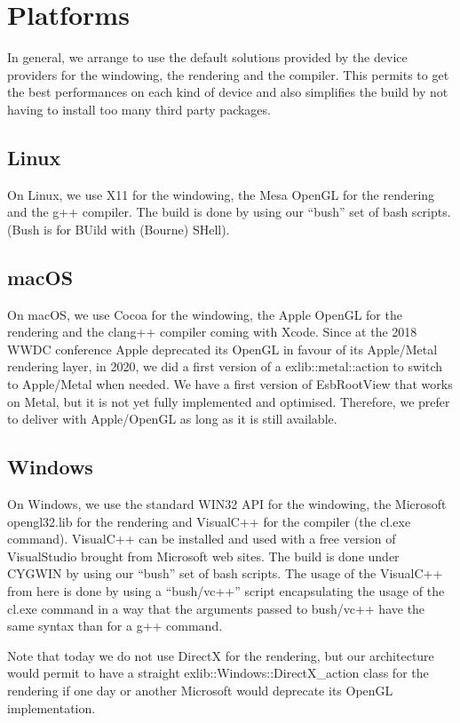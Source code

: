 \documentclass{webofc}
\begin{document}
\section{Platforms}
In general, we arrange to use the default solutions provided by the
device providers for the windowing, the rendering and the
compiler. This permits to get the best performances on each kind of
device and also simplifies the build by not having to install too
many third party packages.

\subsection{Linux}
On Linux, we use X11 for the windowing, the Mesa OpenGL for the
rendering and the g++ compiler. The build is done by using our
``bush'' set of bash scripts. (Bush is for BUild with (Bourne) SHell).

\subsection{macOS}
On macOS, we use Cocoa for the windowing, the Apple OpenGL for the
rendering and the clang++ compiler coming with Xcode. Since at the 2018 WWDC
conference Apple deprecated its OpenGL in favour of its Apple/Metal
rendering layer, in 2020, we did a first version of a
exlib::metal::action to switch to Apple/Metal when needed. We have a
first version of EsbRootView that works on Metal, but it is not yet
fully implemented and optimised. Therefore, we prefer to deliver with
Apple/OpenGL as long as it is still available.

\subsection{Windows}
On Windows, we use the standard WIN32 API for the windowing, the
Microsoft opengl32.lib for the rendering and VisualC++ for the
compiler (the cl.exe command). VisualC++ can be installed and used
with a free version of VisualStudio brought from Microsoft web sites.
The build is done under CYGWIN by using our ``bush'' set of
bash scripts. The usage of the VisualC++ from here is done by using a ``bush/vc++'' script
encapsulating the usage of the cl.exe command in a way that the
arguments passed to bush/vc++ have the same syntax than for a g++ command.

Note that today we do not use DirectX for the rendering, but our
architecture would permit to have a straight
exlib::Windows::DirectX\_action class for
the rendering if one day or another Microsoft would deprecate its
OpenGL implementation.
\end{document}
